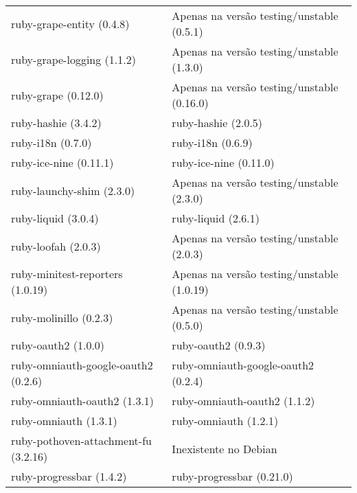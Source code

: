 \begin{table}[h]
\begin{tabular}{l|l}
        ruby-grape-entity (0.4.8)                        & Apenas na versão testing/unstable (0.5.1)  \\ 
        ruby-grape-logging (1.1.2)                       & Apenas na versão testing/unstable (1.3.0)  \\ 
        ruby-grape (0.12.0)                              & Apenas na versão testing/unstable (0.16.0) \\ 
        ruby-hashie (3.4.2)                              & ruby-hashie (2.0.5)                                               \\ 
        ruby-i18n (0.7.0)                                & ruby-i18n (0.6.9)                                                 \\ 
        ruby-ice-nine (0.11.1)                           & ruby-ice-nine (0.11.0)                                            \\ 
        ruby-launchy-shim (2.3.0)                        & Apenas na versão testing/unstable (2.3.0)  \\ 
        ruby-liquid (3.0.4)                              & ruby-liquid (2.6.1)                                               \\ 
        ruby-loofah (2.0.3)                              & Apenas na versão testing/unstable (2.0.3)  \\ 
        ruby-minitest-reporters (1.0.19)                 & Apenas na versão testing/unstable (1.0.19) \\ 
        ruby-molinillo (0.2.3)                           & Apenas na versão testing/unstable (0.5.0)  \\ 
        ruby-oauth2 (1.0.0)                              & ruby-oauth2 (0.9.3)                                               \\ 
        ruby-omniauth-google-oauth2 (0.2.6)              & ruby-omniauth-google-oauth2 (0.2.4)                               \\ 
        ruby-omniauth-oauth2 (1.3.1)                     & ruby-omniauth-oauth2 (1.1.2)                                      \\ 
        ruby-omniauth (1.3.1)                            & ruby-omniauth (1.2.1)                                             \\ 
        ruby-pothoven-attachment-fu (3.2.16)             & Inexistente no Debian                                             \\ 
        ruby-progressbar (1.4.2)                         & ruby-progressbar (0.21.0)                                         \\

\end{tabular}
\end{table}
